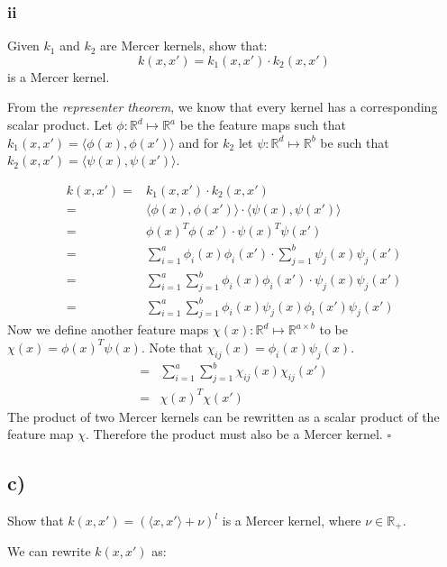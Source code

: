\documentclass{article}
\newcommand{\R}[0]{\mathbb{R}}
\begin{document}
\subsubsection*{ii}

Given $k_1$ and $k_2$ are Mercer kernels, show that:
\begin{equation}
    k(x, x') = k_1(x, x') \cdot k_2(x, x')
\end{equation}
is a Mercer kernel.


From the \emph{representer theorem}, we know that every kernel has a corresponding
scalar product.
Let $\phi : \R^d \mapsto \R^a $ be the feature maps such that $k_1(x, x') = \langle{}\phi(x),\phi(x')\rangle{}$ and
for $k_2$ let  $\psi : \R^d \mapsto \R^b$ be such that $k_2(x, x') = \langle{}\psi(x),\psi(x')\rangle{}$.

\begin{align}
    k(x, x') = &k_1(x, x') \cdot k_2(x, x')\\
    = & \langle{}\phi(x), \phi(x')\rangle{} \cdot \langle{}\psi(x), \psi(x')\rangle{}\\
    = & \phi(x)^T \phi(x') \cdot \psi(x)^T \psi(x')\\
    = & \sum_{i=1}^a \phi_i(x) \phi_i(x') \cdot \sum_{j=1}^b \psi_j(x) \psi_j(x')\\
    = & \sum_{i=1}^a \sum_{j=1}^b \phi_i(x) \phi_i(x') \cdot  \psi_j(x) \psi_j(x')\\
    = & \sum_{i=1}^a \sum_{j=1}^b \phi_i(x)  \psi_j(x) \phi_i(x') \psi_j(x')
\end{align}
Now we define another feature maps
$\chi(x) : \R^d \mapsto \R^{a \times b}$ to be $\chi(x) = \phi(x)^T \psi(x)$.
Note that $\chi_{ij}(x) = \phi_i(x) \psi_j(x)$.
\begin{align}
    = & \sum_{i=1}^a \sum_{j=1}^b \chi_{ij}(x)  \chi_{ij}(x') \\
    = & \chi(x)^T  \chi(x')
\end{align}
The product of two Mercer kernels can be rewritten as a scalar product of
the feature map $\chi$. Therefore the product must also be a Mercer kernel.
\hfill $\square$

\subsection*{c)}

Show that $ k(x, x') = (\langle{}x, x'\rangle{} + \nu)^l$ is a Mercer kernel, where $\nu \in \R_+$.

We can rewrite $k(x, x')$ as:
\end{document}
